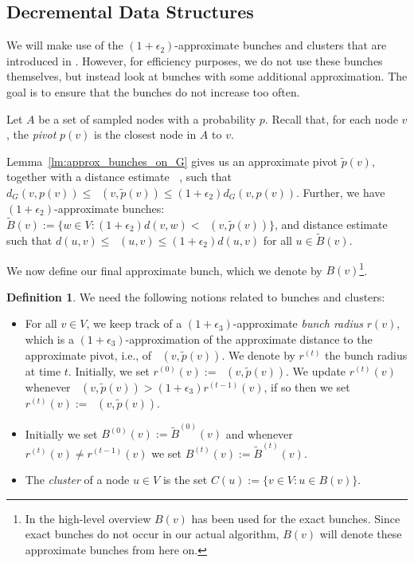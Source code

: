 \documentclass[11pt]{article}
\theoremstyle{definition}
\newtheorem{definition}{Definition}
\theoremstyle{remark}
\newcommand{\ttodo}[1]{\todo[color=orange!20]{T: #1}}
\DeclareMathOperator{\dLNbunch}{\delta_{\tilde{B}}}
\begin{document}
    
\subsection{Decremental Data Structures}\label{sc:mult_alg}

We will make use of the $(1+\epsilon_2)$-approximate bunches and clusters that are introduced in . However, for efficiency purposes, we do not use these bunches themselves, but instead look at bunches with some additional approximation. The goal is to ensure that the bunches do not increase too often. 

Let $A$ be a set of sampled nodes with a probability $p$. Recall that, for each node $v$, the \emph{pivot} $p(v)$ is the closest node in $A$ to $v$.

Lemma~\ref{lm:approx_bunches_on_G} gives us an approximate pivot $\tilde p(v)$, together with a distance estimate $\dLNbunch$, such that $d_G(v,p(v)) \leq \dLNbunch(v,\tilde{p}(v)) \leq (1+\epsilon_2) d_G(v,p(v))$. Further, we have $(1+\epsilon_2)$-approximate bunches: $\tilde B(v) := \{w\in V : (1+\epsilon_2)d(v,w) < \dLNbunch(v,\tilde p(v))\}$, and distance estimate $\dLNbunch$ such that $d(u,v)\leq \dLNbunch(u,v)\leq (1+\epsilon_2)d(u,v)$ for all $u\in \tilde B(v)$.


We now define our final approximate bunch, which we denote by $B(v)$\footnote{In the high-level overview $B(v)$ has been used for the exact bunches. Since exact bunches do not occur in our actual algorithm, $B(v)$ will denote these approximate bunches from here on.}.
\begin{definition}\label{def:app_app_bunch}
We need the following notions related to bunches and clusters:
\begin{itemize}
    \item For all $v \in V$, we keep track of a $(1+\epsilon_3)$-approximate \emph{bunch radius} $r(v)$, which is a $(1+\epsilon_3)$-approximation of the approximate distance to the approximate pivot, i.e., of $\dLNbunch(v,\tilde{p}(v))$. We denote by $r^{(t)}$ the bunch radius at time $t$. Initially, we set $r^{(0)}(v):=\dLNbunch(v,\tilde{p}(v))$. We update $r^{(t)}(v)$ whenever $\dLNbunch(v,\tilde{p}(v)) > (1+\epsilon_3)r^{(t-1)}(v)$, if so then we set $r^{(t)}(v):=\dLNbunch(v,\tilde{p}(v))$.
    \item Initially we set $B^{(0)}(v):= \tilde B^{(0)}(v)$ and whenever $r^{(t)}(v)\neq r^{(t-1)}(v)$ we set $B^{(t)}(v):=\tilde B^{(t)}(v)$.
    \item The \textit{cluster} of a node $u\in V$ is the set $C(u):= \{ v \in V: u \in B(v) \}$.
\end{itemize}    
\end{definition}
\end{document}
